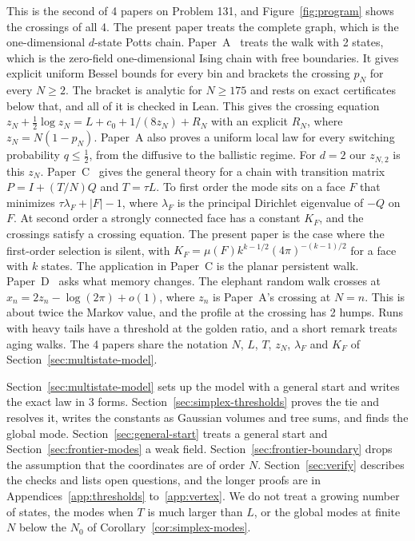 \documentclass[11pt]{article}
\theoremstyle{definition}
\theoremstyle{remark}
\begin{document}
This is the second of 4 papers on Problem 131, and Figure~\ref{fig:program}
shows the crossings of all 4. The present paper treats the complete graph,
which is the one-dimensional $d$-state Potts chain. Paper~A~\cite{paperA}
treats the walk with 2 states, which is the zero-field one-dimensional Ising
chain with free boundaries. It gives explicit uniform Bessel bounds for every
bin and brackets the crossing $p_N$ for every $N\ge2$. The bracket is analytic
for $N\ge175$ and rests on exact certificates below that, and all of it is
checked in Lean. This gives the crossing equation
$z_N+\frac12\log z_N=L+c_0+1/(8z_N)+R_N$ with an explicit $R_N$, where
$z_N=N(1-p_N)$. Paper~A also proves a uniform local law for every switching
probability $q\le\frac12$, from the diffusive to the ballistic regime. For
$d=2$ our $z_{N,2}$ is this $z_N$. Paper~C~\cite{paperC} gives the general
theory for a chain with transition matrix $P=I+(T/N)Q$ and $T=\tau L$. To first
order the mode sits on a face $F$ that minimizes $\tau\lambda_F+|F|-1$, where
$\lambda_F$ is the principal Dirichlet eigenvalue of $-Q$ on $F$. At second
order a strongly connected face has a constant $K_F$, and the crossings satisfy
a crossing equation. The present paper is the case where the first-order
selection is silent, with $K_F=\mu(F)k^{k-1/2}(4\pi)^{-(k-1)/2}$ for a face with
$k$ states. The application in Paper~C is the planar persistent walk.
Paper~D~\cite{paperD} asks what memory changes. The elephant random walk
crosses at $x_n=2z_n-\log(2\pi)+o(1)$, where $z_n$ is Paper~A's crossing at
$N=n$. This is about twice the Markov value, and the profile at the crossing
has 2 humps. Runs with heavy tails have a threshold at the golden ratio, and a
short remark treats aging walks. The 4 papers share the notation $N$, $L$,
$T$, $z_N$, $\lambda_F$ and $K_F$ of Section~\ref{sec:multistate-model}.

Section~\ref{sec:multistate-model} sets up the model with a general start and
writes the exact law in 3 forms. Section~\ref{sec:simplex-thresholds} proves
the tie and resolves it, writes the constants as Gaussian volumes and tree
sums, and finds the global mode. Section~\ref{sec:general-start} treats a
general start and Section~\ref{sec:frontier-modes} a weak field.
Section~\ref{sec:frontier-boundary} drops the assumption that the coordinates
are of order $N$. Section~\ref{sec:verify} describes the checks and lists open
questions, and the longer proofs are in Appendices~\ref{app:thresholds}
to~\ref{app:vertex}. We do not treat a growing number of states, the modes
when $T$ is much larger than $L$, or the global modes at finite $N$ below the
$N_0$ of Corollary~\ref{cor:simplex-modes}.
\end{document}
